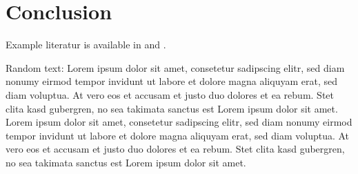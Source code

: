 \documentclass[11pt,a4paper]{article}
\begin{document}
\section{Conclusion}
\label{sec:concl}

Example literatur is available in \cite{shirley:2009} and \cite{seiler:2013}.

Random text: Lorem ipsum dolor sit amet, consetetur sadipscing elitr, sed diam nonumy 
eirmod tempor invidunt ut labore et dolore magna aliquyam erat, sed diam voluptua. At 
vero eos et accusam et justo duo dolores et ea rebum. Stet clita kasd gubergren, no sea 
takimata sanctus est Lorem ipsum dolor sit amet. Lorem ipsum dolor sit amet, consetetur 
sadipscing elitr, sed diam nonumy eirmod tempor invidunt ut labore et dolore magna 
aliquyam erat, sed diam voluptua. At vero eos et accusam et justo duo dolores et ea 
rebum. Stet clita kasd gubergren, no sea takimata sanctus est Lorem ipsum dolor sit amet.

    




\end{document}
